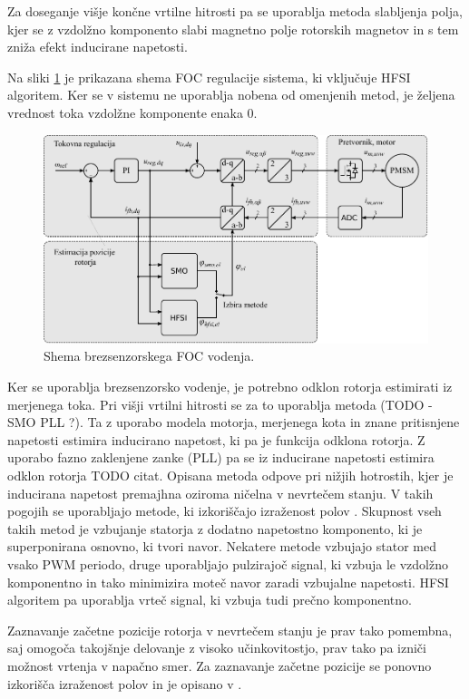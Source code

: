\documentclass[a4paper,twoside,openright,12pt,slovene]{book}
\begin{document}
Za doseganje višje končne vrtilne hitrosti pa se uporablja metoda slabljenja polja, kjer se z vzdolžno komponento slabi magnetno polje rotorskih magnetov in s tem zniža efekt inducirane
napetosti\cite{ambrovzivc2016elektrivcni}.

Na sliki \ref{FOCshema} je prikazana shema FOC regulacije sistema, ki vključuje HFSI algoritem. Ker se v sistemu ne uporablja nobena od omenjenih metod, je željena vrednost toka vzdolžne komponente enaka 0.

\begin{figure}[!htbp]
    \centering
    \includegraphics[width=0.75\columnwidth]{Slike/Inkscape/FOC-eps-converted-to.pdf}
    \caption{\label{FOCshema} Shema brezsenzorskega FOC vodenja.}
\end{figure}

Ker se uporablja brezsenzorsko vodenje, je potrebno odklon rotorja estimirati iz merjenega toka. Pri višji vrtilni hitrosti se za to uporablja metoda (TODO - SMO PLL ?). Ta z uporabo modela motorja, merjenega
kota in znane pritisnjene napetosti estimira inducirano napetost, ki pa je funkcija odklona rotorja. Z uporabo fazno zaklenjene zanke (PLL) pa se iz inducirane napetosti estimira odklon rotorja TODO
citat.
Opisana metoda odpove pri nižjih hotrostih, kjer je inducirana napetost premajhna oziroma ničelna v nevrtečem stanju. V takih pogojih se uporabljajo metode, ki izkoriščajo izraženost polov \cite{ThreeYearsOfExperience}. Skupnost
vseh takih metod je vzbujanje statorja z dodatno napetostno komponento, ki je superponirana osnovno, ki tvori navor. Nekatere metode vzbujajo stator med vsako PWM periodo, druge uporabljajo pulzirajoč
signal, ki vzbuja le vzdolžno komponentno in tako minimizira moteč navor zaradi vzbujalne napetosti. HFSI algoritem pa uporablja vrteč signal, ki vzbuja tudi prečno komponentno. 

Zaznavanje začetne pozicije rotorja v nevrtečem stanju je prav tako pomembna, saj omogoča takojšnje delovanje z visoko učinkovitostjo, prav tako pa izniči možnost vrtenja v napačno smer. Za zaznavanje
začetne pozicije se ponovno izkorišča izraženost polov in je opisano v \cite{IPDBoussak}.
\end{document}
